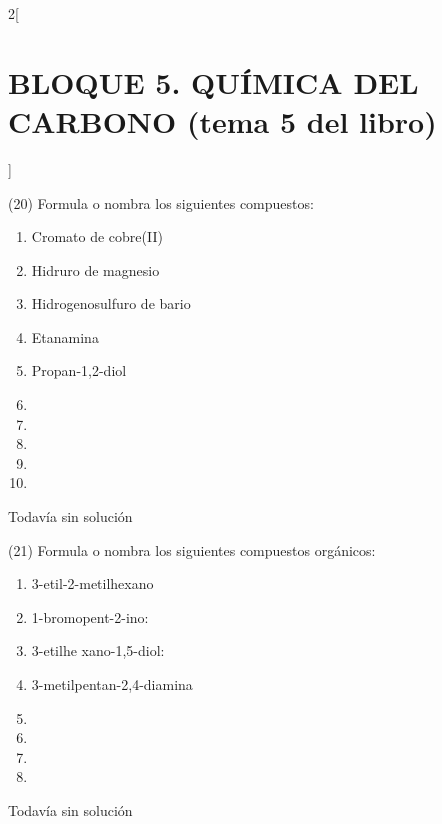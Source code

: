 \documentclass[10pt]{article}
\begin{document}
\begin{multicols}{2}[
  \section{BLOQUE 5. QUÍMICA DEL CARBONO (tema 5 del libro)}
  ]
\begin{exercise}[
    tags    = {},
    topics  = {química, química orgánica, orgánica},
    source  = {FQ 1B MGH 2016, p151, e20},
  ]
  (20) Formula o nombra los siguientes compuestos:
  \begin{enumerate}
    \item Cromato de cobre(II)
    \item Hidruro de magnesio
    \item Hidrogenosulfuro de bario
    \item Etanamina
    \item Propan-1,2-diol
    \item {}
    \item {}
    \item {}
    \item {}
    \item {}
  \end{enumerate}
\end{exercise}

\begin{solution}[print=false]
  Todavía sin solución
\end{solution}




\begin{exercise}[
    tags    = {},
    topics  = {química, química orgánica, orgánica},
    source  = {FQ 1B MGH 2016, p151, e21},
  ]
  (21) Formula o nombra los siguientes compuestos orgánicos:
  \begin{enumerate}
    \item 3-etil-2-metilhexano
    \item 1-bromopent-2-ino:
    \item 3-etilhe xano-1,5-diol:
    \item 3-metilpentan-2,4-diamina
    \item {}
    \item {}
    \item {}
    \item {}
  \end{enumerate}
\end{exercise}

\begin{solution}[print=false]
  Todavía sin solución
\end{solution}







\end{multicols}
\end{document}
